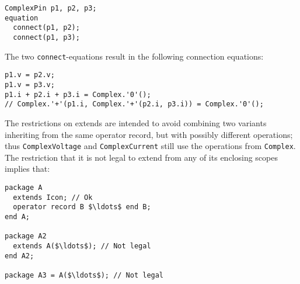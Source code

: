 \begin{example}
\begin{lstlisting}[language=modelica]
  ComplexPin p1, p2, p3;
equation
  connect(p1, p2);
  connect(p1, p3);
\end{lstlisting}
The two \lstinline!connect!-equations result in the following connection equations:
\begin{lstlisting}[language=modelica]
p1.v = p2.v;
p1.v = p3.v;
p1.i + p2.i + p3.i = Complex.'0'();
// Complex.'+'(p1.i, Complex.'+'(p2.i, p3.i)) = Complex.'0'();
\end{lstlisting}
The restrictions on extends are intended to avoid combining two variants inheriting from the same operator record, but with possibly different operations; thus \lstinline!ComplexVoltage! and \lstinline!ComplexCurrent! still use the operations from \lstinline!Complex!.  The restriction that it is not legal to extend from any of its enclosing scopes implies that:
\begin{lstlisting}[language=modelica]
package A
  extends Icon; // Ok
  operator record B $\ldots$ end B;
end A;

package A2
  extends A($\ldots$); // Not legal
end A2;

package A3 = A($\ldots$); // Not legal
\end{lstlisting}
\end{example}
